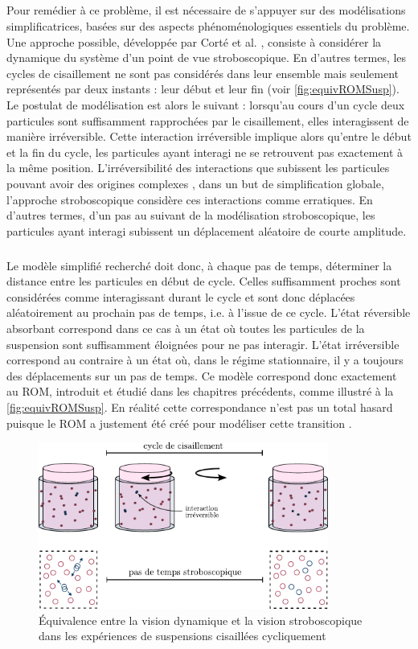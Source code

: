 \subparagraph{}Pour remédier à ce problème, il est nécessaire de s'appuyer sur des modélisations simplificatrices, basées sur des aspects phénoménologiques essentiels du problème. Une approche possible, développée par Corté et al. \cite{corte_random_2008}, consiste à considérer la dynamique du système d'un point de vue stroboscopique. En d'autres termes, les cycles de cisaillement ne sont pas considérés dans leur ensemble mais seulement représentés par deux instants : leur début et leur fin (voir \autoref{fig:equivROMSusp}). Le postulat de modélisation est alors le suivant : lorsqu'au cours d'un cycle deux particules sont suffisamment rapprochées par le cisaillement, elles interagissent de manière irréversible. Cette interaction irréversible implique alors qu'entre le début et la fin du cycle, les particules ayant interagi ne se retrouvent pas exactement à la même position. L'irréversibilité des interactions que subissent les particules pouvant avoir des origines complexes \cite{drazer_microstructure_2004}, dans un but de simplification globale, l'approche stroboscopique considère ces interactions comme erratiques. En d'autres termes, d'un pas au suivant de la modélisation stroboscopique, les particules ayant interagi subissent un déplacement aléatoire de courte amplitude.

\subparagraph{}Le modèle simplifié recherché doit donc, à chaque pas de temps, déterminer la distance entre les particules en début de cycle. Celles suffisamment proches sont considérées comme interagissant durant le cycle et sont donc déplacées aléatoirement au prochain pas de temps, i.e. à l’issue de ce cycle. L'état réversible absorbant correspond dans ce cas à un état où toutes les particules de la suspension sont suffisamment éloignées pour ne pas interagir. L'état irréversible correspond au contraire à un état où, dans le régime stationnaire, il y a toujours des déplacements sur un pas de temps. Ce modèle correspond donc exactement au ROM, introduit et étudié dans les chapitres précédents, comme illustré à la \autoref{fig:equivROMSusp}. En réalité cette correspondance n'est pas un total hasard puisque le ROM a justement été créé pour modéliser cette transition \cite{corte_random_2008}.

\begin{figure}[h]
	\centering
	\includegraphics[width=0.85\textwidth]{Chapitre3/Figures/Method/equivROMSusp.pdf}
	\caption{Équivalence entre la vision dynamique et la vision stroboscopique dans les expériences de suspensions cisaillées cycliquement}
	\label{fig:equivROMSusp}
\end{figure}

